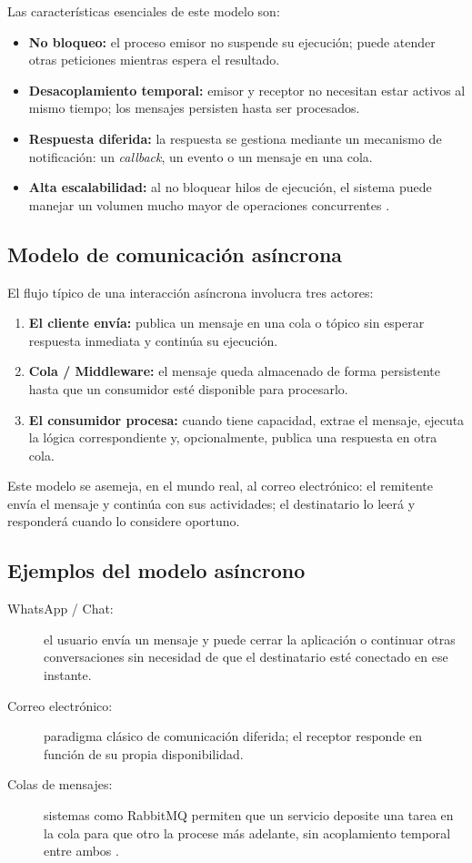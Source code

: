 \documentclass[12pt,a4paper]{article}
\begin{document}
Las características esenciales de este modelo son:
 
\begin{itemize}[leftmargin=1.5cm]
  \item \textbf{No bloqueo:} el proceso emisor no suspende su ejecución; puede atender otras peticiones mientras espera el resultado.
  \item \textbf{Desacoplamiento temporal:} emisor y receptor no necesitan estar activos al mismo tiempo; los mensajes persisten hasta ser procesados.
  \item \textbf{Respuesta diferida:} la respuesta se gestiona mediante un mecanismo de notificación: un \textit{callback}, un evento o un mensaje en una cola.
  \item \textbf{Alta escalabilidad:} al no bloquear hilos de ejecución, el sistema puede manejar un volumen mucho mayor de operaciones concurrentes \cite{ref10}.
\end{itemize}
 
\subsection{Modelo de comunicación asíncrona}
 
El flujo típico de una interacción asíncrona involucra tres actores:
 
\begin{enumerate}
  \item \textbf{El cliente envía:} publica un mensaje en una cola o tópico sin esperar respuesta inmediata y continúa su ejecución.
  \item \textbf{Cola / Middleware:} el mensaje queda almacenado de forma persistente hasta que un consumidor esté disponible para procesarlo.
  \item \textbf{El consumidor procesa:} cuando tiene capacidad, extrae el mensaje, ejecuta la lógica correspondiente y, opcionalmente, publica una respuesta en otra cola.
\end{enumerate}
 
Este modelo se asemeja, en el mundo real, al correo electrónico: el remitente envía el mensaje y continúa con sus actividades; el destinatario lo leerá y responderá cuando lo considere oportuno.
 
\subsection{Ejemplos del modelo asíncrono}
 
\begin{description}
  \item[WhatsApp / Chat:] el usuario envía un mensaje y puede cerrar la aplicación o continuar otras conversaciones sin necesidad de que el destinatario esté conectado en ese instante.
  \item[Correo electrónico:] paradigma clásico de comunicación diferida; el receptor responde en función de su propia disponibilidad.
  \item[Colas de mensajes:] sistemas como RabbitMQ permiten que un servicio deposite una tarea en la cola para que otro la procese más adelante, sin acoplamiento temporal entre ambos \cite{ref11}.
\end{description}
 
\end{document}
